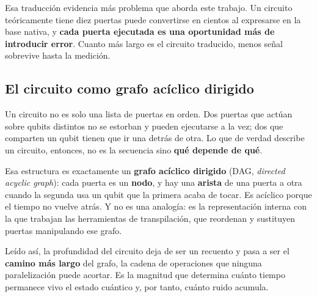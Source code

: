 Esa traducción evidencia más problema que aborda este trabajo. Un
circuito teóricamente tiene diez puertas puede convertirse en cientos al expresarse en
la base nativa, y \textbf{cada puerta ejecutada es una oportunidad más de introducir
error}. Cuanto más largo es el circuito traducido, menos señal sobrevive hasta la medición.


\subsection{El circuito como grafo acíclico dirigido}
\label{sec:dag}
Un circuito no es solo una lista de puertas en orden. Dos puertas que actúan sobre qubits
distintos no se estorban y pueden ejecutarse a la vez; dos que comparten un qubit tienen que
ir una detrás de otra. Lo que de verdad describe un circuito, entonces, no es la secuencia
sino \textbf{qué depende de qué}.

Esa estructura es exactamente un \textbf{grafo acíclico dirigido} (DAG, \textit{directed
acyclic graph}): cada puerta es un \textbf{nodo}, y hay una \textbf{arista} de una puerta a
otra cuando la segunda usa un qubit que la primera acaba de tocar. Es acíclico porque el
tiempo no vuelve atrás. Y no es una analogía: es la representación interna con la que
trabajan las herramientas de transpilación, que reordenan y sustituyen puertas manipulando
ese grafo.

Leído así, la profundidad del circuito deja de ser un recuento y pasa a ser el
\textbf{camino más largo} del grafo, la cadena de operaciones que ninguna paralelización
puede acortar. Es la magnitud que determina cuánto tiempo permanece vivo el estado cuántico y,
por tanto, cuánto ruido acumula.

